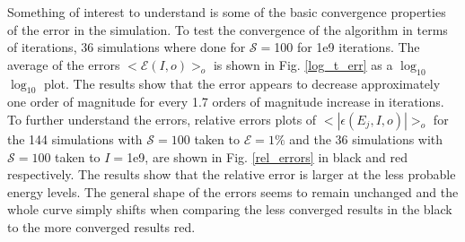 \documentclass[aps,prl,reprint,superscriptaddress,showkeys]{revtex4-1}
\begin{document}
Something of interest to understand is some of the basic convergence properties of the error in the simulation. To test the convergence of the algorithm in terms of iterations,  36 simulations where done for  $\mathcal{S}=$100 for 1e9 iterations. The average of the errors $<\mathcal{E}(I,o)>_o$ is shown in Fig. \ref{log_t_err}  as a $\log_{10}$ $\log_{10}$  plot. The results show that the error appears to decrease approximately one order of magnitude for every 1.7 orders of magnitude increase in iterations.  To further understand the errors, relative errors plots of $<|\epsilon(E_j,I,o)|>_o$ for the 144 simulations with $\mathcal{S}=100$ taken to $\mathcal{E}=1\%$ and the 36 simulations with $\mathcal{S}=100$ taken to $I=$1e9,  are shown in Fig. \ref{rel_errors} in black and red respectively. The results show that the relative error is larger at the less probable energy levels. The general shape of the errors seems to remain unchanged and the whole curve simply shifts when comparing the less converged results in the black to the more converged results red. 
\end{document}
